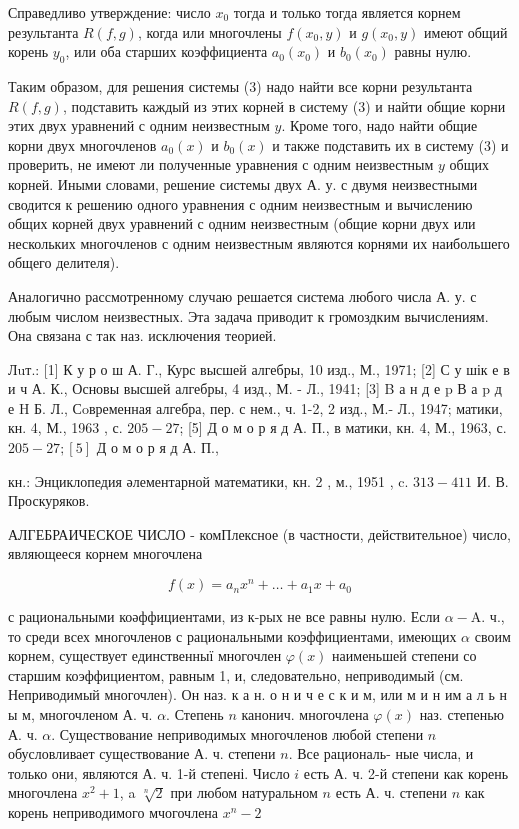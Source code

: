 \documentclass[10pt]{article}
\begin{document}
Справедливо утверждение: число $x_{0}$ тогда и только тогда является корнем результанта $R(f, g)$, когда или многочлены $f\left(x_{0}, y\right)$ и $g\left(x_{0}, y\right)$ имеют общий корень $y_{0}$, или оба старших коэффициента $a_{0}\left(x_{0}\right)$ и $b_{0}\left(x_{0}\right)$ равны нулю.



Таким образом, для решения системы (3) надо найти все корни результанта $R(f, g)$, подставить каждый из этих корней в систему (3) и найти общие корни этих двух уравнений с одним неизвестным $y$. Кроме того, надо найти общие корни двух многочленов $a_{0}(x)$ и $b_{0}(x)$ и также подставить их в систему (3) и проверить, не имеют ли полученные уравнения с одним неизвестным $y$ общих корней. Иными словами, решение системы двух А. у. с двумя неизвестными сводится к решению одного уравнения с одним неизвестным и вычислению общих корней двух уравнений с одним неизвестным (общие корни двух или нескольких многочленов с одним неизвестным являются корнями их наибольшего общего делителя).



Аналогично рассмотренному случаю решается система любого числа А. у. с любым числом неизвестных. Эта задача приводит к громоздким вычислениям. Она связана с так наз. исключения теорией.



Лuт.: [1] К у р о ш А. Г., Курс высшей алгебры, 10 изд., М., 1971; [2] С у шік е в и ч А. К., Основы высшей алгебры, 4 изд., М. - Л., 1941; [3] B а н д е $\mathrm{p}$ В а p д е $\mathrm{H}$ Б. Л., Сoвременная алгебра, пер. с нем., ч. 1-2, 2 изд., М.- Л., 1947; матики, кн. 4, М., 1963 , с. $205-27$; [5] Д о м о р я д А. П., в матики, кн. 4, М., 1963, с. $205-27 ;[5]$ Д о м о р я д А. П.,

кн.: Энциклопедия әлементарной математики, кн. 2 , м., 1951 , c. $313-411$ И. В. Проскуряков.



АЛГЕБРАИЧЕСКОЕ ЧИСЛО - комПлексное (в частности, действительное) число, являющееся корнем многочлена



\[

f(x)=a_{n} x^{n}+\ldots+a_{1} x+a_{0}

\]



с рациональными коәффициентами, из к-рых не все равны нулю. Если $\alpha-\mathrm{A}$. ч., то среди всех многочленов с рациональными коэффициентами, имеющих $\alpha$ своим корнем, существует единственныї многочлен $\varphi(x)$ наименьшей степени со старшим коэффициентом, равным 1, и, следовательно, неприводимый (см. Неприводимый многочлен). Он наз. к а н. о н и ч е с к и м, или м и н им а л ь н ы м, многочленом А. ч. $\alpha$. Степень $n$ канонич. многочлена $\varphi(x)$ наз. степенью А. ч. $\alpha$. Существование неприводимых многочленов любой степени $n$ обусловливает существование А. ч. степени $n$. Все рациональ- ные числа, и только они, являются А. ч. 1-й степені. Число $i$ есть А. ч. 2-й степени как корень многочлена $x^{2}+1$, a $\sqrt[n]{2}$ при любом натуральном $n$ есть А. ч. степени $n$ как корень неприводимого мчогочлена $x^{n}-2$
\end{document}
